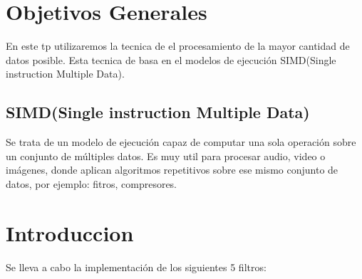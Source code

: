 \documentclass[a4paper]{article}
\begin{document}
%
\section{Objetivos Generales}
En este tp utilizaremos la tecnica de el procesamiento de la mayor cantidad de datos posible. Esta tecnica de basa en el modelos de ejecución SIMD(Single instruction Multiple Data).
\subsection{SIMD(Single instruction Multiple Data)}
	Se trata de un modelo de ejecución capaz de computar una sola operación sobre un conjunto de múltiples datos. \newline
	Es muy util para procesar audio, video o imágenes, donde aplican algoritmos repetitivos sobre ese mismo conjunto de datos, 
	por ejemplo: fitros, compresores. 
	


%
\section{Introduccion}


Se lleva a cabo la implementación de los siguientes 5 filtros:
\end{document}
